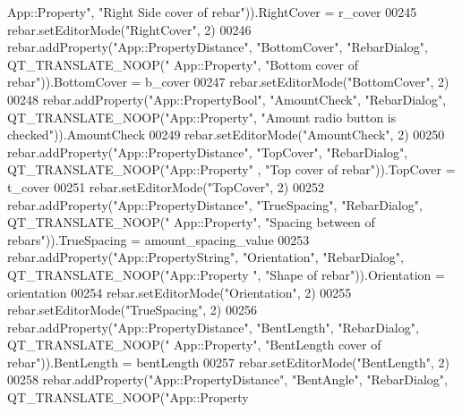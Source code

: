 \begin{DoxyCode}
{      App::Property"}, \textcolor{stringliteral}{"Right Side cover of rebar"})).RightCover = r\_cover
00245     rebar.setEditorMode(\textcolor{stringliteral}{"RightCover"}, 2)
00246     rebar.addProperty(\textcolor{stringliteral}{"App::PropertyDistance"}, \textcolor{stringliteral}{"BottomCover"}, \textcolor{stringliteral}{"RebarDialog"}, QT\_TRANSLATE\_NOOP(\textcolor{stringliteral}{"
      App::Property"}, \textcolor{stringliteral}{"Bottom cover of rebar"})).BottomCover = b\_cover
00247     rebar.setEditorMode(\textcolor{stringliteral}{"BottomCover"}, 2)
00248     rebar.addProperty(\textcolor{stringliteral}{"App::PropertyBool"}, \textcolor{stringliteral}{"AmountCheck"}, \textcolor{stringliteral}{"RebarDialog"}, QT\_TRANSLATE\_NOOP(\textcolor{stringliteral}{"App::Property"},
       \textcolor{stringliteral}{"Amount radio button is checked"})).AmountCheck
00249     rebar.setEditorMode(\textcolor{stringliteral}{"AmountCheck"}, 2)
00250     rebar.addProperty(\textcolor{stringliteral}{"App::PropertyDistance"}, \textcolor{stringliteral}{"TopCover"}, \textcolor{stringliteral}{"RebarDialog"}, QT\_TRANSLATE\_NOOP(\textcolor{stringliteral}{"App::Property"}
      , \textcolor{stringliteral}{"Top cover of rebar"})).TopCover = t\_cover
00251     rebar.setEditorMode(\textcolor{stringliteral}{"TopCover"}, 2)
00252     rebar.addProperty(\textcolor{stringliteral}{"App::PropertyDistance"}, \textcolor{stringliteral}{"TrueSpacing"}, \textcolor{stringliteral}{"RebarDialog"}, QT\_TRANSLATE\_NOOP(\textcolor{stringliteral}{"
      App::Property"}, \textcolor{stringliteral}{"Spacing between of rebars"})).TrueSpacing = amount\_spacing\_value
00253     rebar.addProperty(\textcolor{stringliteral}{"App::PropertyString"}, \textcolor{stringliteral}{"Orientation"}, \textcolor{stringliteral}{"RebarDialog"}, QT\_TRANSLATE\_NOOP(\textcolor{stringliteral}{"App::Property
      "}, \textcolor{stringliteral}{"Shape of rebar"})).Orientation = orientation
00254     rebar.setEditorMode(\textcolor{stringliteral}{"Orientation"}, 2)
00255     rebar.setEditorMode(\textcolor{stringliteral}{"TrueSpacing"}, 2)
00256     rebar.addProperty(\textcolor{stringliteral}{"App::PropertyDistance"}, \textcolor{stringliteral}{"BentLength"}, \textcolor{stringliteral}{"RebarDialog"}, QT\_TRANSLATE\_NOOP(\textcolor{stringliteral}{"
      App::Property"}, \textcolor{stringliteral}{"BentLength cover of rebar"})).BentLength = bentLength
00257     rebar.setEditorMode(\textcolor{stringliteral}{"BentLength"}, 2)
00258     rebar.addProperty(\textcolor{stringliteral}{"App::PropertyDistance"}, \textcolor{stringliteral}{"BentAngle"}, \textcolor{stringliteral}{"RebarDialog"}, QT\_TRANSLATE\_NOOP(\textcolor{stringliteral}{"App::Property
}
\end{DoxyCode}
